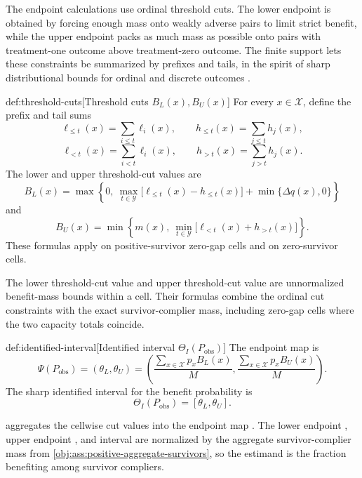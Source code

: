 The endpoint calculations use ordinal threshold cuts. The lower endpoint is obtained by forcing enough mass onto weakly adverse pairs to limit strict benefit, while the upper endpoint packs as much mass as possible onto pairs with treatment-one outcome above treatment-zero outcome. The finite support lets these constraints be summarized by prefixes and tails, in the spirit of sharp distributional bounds for ordinal and discrete outcomes \citep{Makarov1982, WilliamsonDowns1990, FanPark2010}.

\begin{definitionv}{def:threshold-cuts}[Threshold cuts \(B_L(x),B_U(x)\)]
For every \(x\in\mathcal X\), define the prefix and tail sums
\[
\ell_{\le t}(x)=\sum_{i\le t}\ell_i(x),
\qquad
h_{\le t}(x)=\sum_{j\le t}h_j(x),
\]
\[
\ell_{<t}(x)=\sum_{i<t}\ell_i(x),
\qquad
h_{>t}(x)=\sum_{j>t}h_j(x).
\]
The lower and upper threshold-cut values are
\[
B_L(x)
=
\max\left\{
0,\
\max_{t\in\mathcal Y}\bigl[\ell_{\le t}(x)-h_{\le t}(x)\bigr]
+\min\{\Delta q(x),0\}
\right\}
\]
and
\[
B_U(x)
=
\min\left\{
m(x),\
\min_{t\in\mathcal Y}\bigl[\ell_{<t}(x)+h_{>t}(x)\bigr]
\right\}.
\]
These formulas apply on positive-survivor zero-gap cells and on zero-survivor cells.
\end{definitionv}

The lower threshold-cut value  and upper threshold-cut value  are unnormalized benefit-mass bounds within a cell. Their formulas combine the ordinal cut constraints with the exact survivor-complier mass, including zero-gap cells where the two capacity totals coincide.

\begin{definitionv}{def:identified-interval}[Identified interval \(\Theta_I(P_{\mathrm{obs}})\)]
The endpoint map is
\[
\Psi(P_{\mathrm{obs}})
=
(\theta_L,\theta_U)
=
\left(
\frac{\sum_{x\in\mathcal X}p_xB_L(x)}{M},
\frac{\sum_{x\in\mathcal X}p_xB_U(x)}{M}
\right).
\]
The sharp identified interval for the benefit probability is
\[
\Theta_I(P_{\mathrm{obs}})=[\theta_L,\theta_U].
\]
\end{definitionv}

 aggregates the cellwise cut values into the endpoint map . The lower endpoint , upper endpoint , and interval  are normalized by the aggregate survivor-complier mass from \cref{obj:ass:positive-aggregate-survivors}, so the estimand is the fraction benefiting among survivor compliers.

